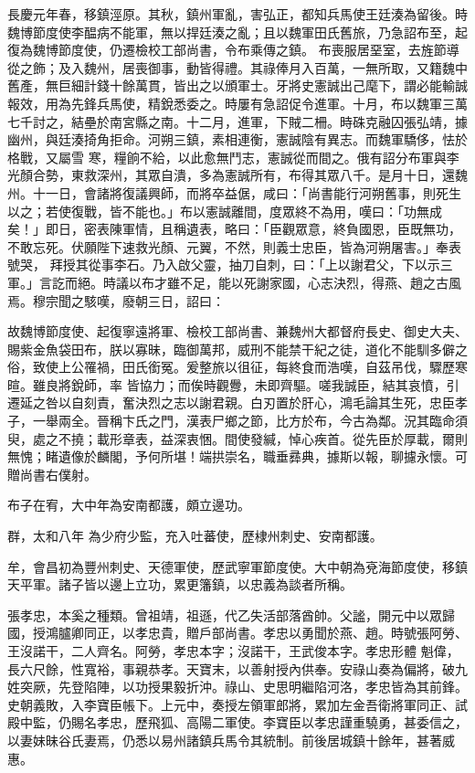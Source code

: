 \begin{pinyinscope}
 長慶元年春，移鎮涇原。其秋，鎮州軍亂，害弘正，都知兵馬使王廷湊為留後。時魏博節度使李醖病不能軍，無以捍廷湊之亂；且以魏軍田氏舊旅，乃急詔布至，起復為魏博節度使，仍遷檢校工部尚書，令布乘傳之鎮。
 布喪服居堊室，去旌節導從之飾；及入魏州，居喪御事，動皆得禮。其祿俸月入百萬，一無所取，又籍魏中舊產，無巨細計錢十餘萬貫，皆出之以頒軍士。牙將史憲誠出己麾下，謂必能輸誠報效，用為先鋒兵馬使，精銳悉委之。時屢有急詔促令進軍。十月，布以魏軍三萬七千討之，結壘於南宮縣之南。十二月，進軍，下賊二柵。時硃克融囚張弘靖，據幽州，與廷湊掎角拒命。河朔三鎮，素相連衡，憲誠陰有異志。而魏軍驕侈，怯於格戰，又屬雪
 寒，糧餉不給，以此愈無鬥志，憲誠從而間之。俄有詔分布軍與李光顏合勢，東救深州，其眾自潰，多為憲誠所有，布得其眾八千。是月十日，還魏州。十一日，會諸將復議興師，而將卒益倨，咸曰：「尚書能行河朔舊事，則死生以之；若使復戰，皆不能也。」布以憲誠離間，度眾終不為用，嘆曰：「功無成矣！」即日，密表陳軍情，且稱遺表，略曰：「臣觀眾意，終負國恩，臣既無功，不敢忘死。伏願陛下速救光顏、元翼，不然，則義士忠臣，皆為河朔屠害。」奉表號哭，
 拜授其從事李石。乃入啟父靈，抽刀自刺，曰：「上以謝君父，下以示三軍。」言訖而絕。時議以布才雖不足，能以死謝家國，心志決烈，得燕、趙之古風焉。穆宗聞之駭嘆，廢朝三日，詔曰：



 故魏博節度使、起復寧遠將軍、檢校工部尚書、兼魏州大都督府長史、御史大夫、賜紫金魚袋田布，朕以寡昧，臨御萬邦，威刑不能禁干紀之徒，道化不能馴多僻之俗，致使上公罹禍，田氏銜冤。爰整旅以徂征，每終食而浩嘆，自茲吊伐，驟歷寒暄。雖良將銳師，率
 皆協力；而俟時觀釁，未即齊驅。嗟我誠臣，結其哀憤，引遷延之咎以自刻責，奮決烈之志以謝君親。白刃置於肝心，鴻毛論其生死，忠臣孝子，一舉兩全。晉稱卞氏之門，漢表尸鄉之節，比方於布，今古為鄰。況其臨命須臾，處之不撓；載形章表，益深衷悃。間使發緘，悼心疾首。從先臣於厚載，爾則無愧；睹遺像於麟閣，予何所堪！端拱崇名，職垂彞典，據斯以報，聊攄永懷。可贈尚書右僕射。



 布子在宥，大中年為安南都護，頗立邊功。



 群，太和八年
 為少府少監，充入吐蕃使，歷棣州刺史、安南都護。



 牟，會昌初為豐州刺史、天德軍使，歷武寧軍節度使。大中朝為兗海節度使，移鎮天平軍。諸子皆以邊上立功，累更籓鎮，以忠義為談者所稱。



 張孝忠，本奚之種類。曾祖靖，祖遜，代乙失活部落酋帥。父謐，開元中以眾歸國，授鴻臚卿同正，以孝忠貴，贈戶部尚書。孝忠以勇聞於燕、趙。時號張阿勞、王沒諾干，二人齊名。阿勞，孝忠本字；沒諾干，王武俊本字。孝忠形體
 魁偉，長六尺餘，性寬裕，事親恭孝。天寶末，以善射授內供奉。安祿山奏為偏將，破九姓突厥，先登陷陣，以功授果毅折沖。祿山、史思明繼陷河洛，孝忠皆為其前鋒。史朝義敗，入李寶臣帳下。上元中，奏授左領軍郎將，累加左金吾衛將軍同正、試殿中監，仍賜名孝忠，歷飛狐、高陽二軍使。李寶臣以孝忠謹重驍勇，甚委信之，以妻妹昧谷氏妻焉，仍悉以易州諸鎮兵馬令其統制。前後居城鎮十餘年，甚著威惠。




\end{pinyinscope}
